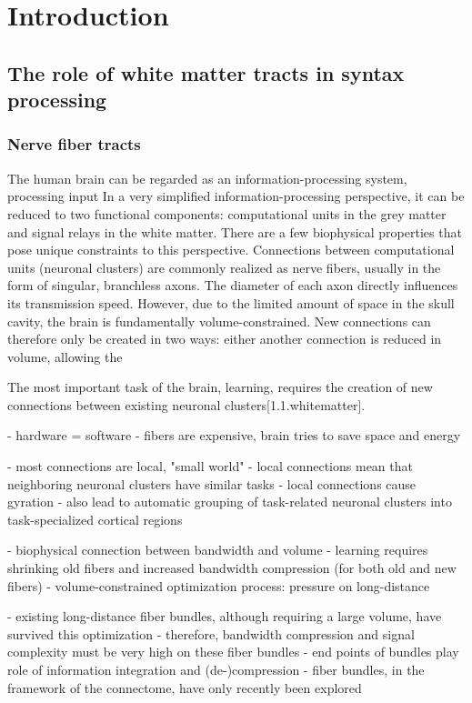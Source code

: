 \chapter{Introduction}

\section{The role of white matter tracts in syntax processing}

\subsection{Nerve fiber tracts}
The human brain can be regarded as an information-processing system, processing input
In a very simplified information-processing perspective, it can be reduced to two functional components: computational units in the grey matter and signal relays in the white matter.
There are a few biophysical properties that pose unique constraints to this perspective.
Connections between computational units (neuronal clusters) are commonly realized as nerve fibers, usually in the form of singular, branchless axons.
The diameter of each axon directly influences its transmission speed.
However, due to the limited amount of space in the skull cavity, the brain is fundamentally volume-constrained.
New connections can therefore only be created in two ways: either another connection is reduced in volume, allowing the 

The most important task of the brain, learning, requires the creation of new connections between existing neuronal clusters[1.1.whitematter].

- hardware = software
- fibers are expensive, brain tries to save space and energy

- most connections are local, "small world"
- local connections mean that neighboring neuronal clusters have similar tasks
- local connections cause gyration
- also lead to automatic grouping of task-related neuronal clusters into task-specialized cortical regions

- biophysical connection between bandwidth and volume
- learning requires shrinking old fibers and increased bandwidth compression (for both old and new fibers)
- volume-constrained optimization process: pressure on long-distance

- existing long-distance fiber bundles, although requiring a large volume, have survived this optimization
- therefore, bandwidth compression and signal complexity must be very high on these fiber bundles
- end points of bundles play role of information integration and (de-)compression
- fiber bundles, in the framework of the connectome, have only recently been explored


